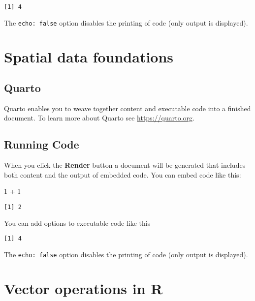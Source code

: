 \documentclass[
  letterpaper,
  DIV=11,
  numbers=noendperiod]{scrreprt}
\newenvironment{Shaded}{\begin{snugshade}}{\end{snugshade}}
\newcommand{\DecValTok}[1]{\textcolor[rgb]{0.68,0.00,0.00}{#1}}
\newcommand{\SpecialCharTok}[1]{\textcolor[rgb]{0.37,0.37,0.37}{#1}}
\begin{document}
\begin{verbatim}
[1] 4
\end{verbatim}

The \texttt{echo:\ false} option disables the printing of code (only
output is displayed).

\hypertarget{spatial-data-foundations}{%
\chapter{Spatial data foundations}\label{spatial-data-foundations}}

\hypertarget{quarto-2}{%
\section{Quarto}\label{quarto-2}}

Quarto enables you to weave together content and executable code into a
finished document. To learn more about Quarto see
\url{https://quarto.org}.

\hypertarget{running-code-2}{%
\section{Running Code}\label{running-code-2}}

When you click the \textbf{Render} button a document will be generated
that includes both content and the output of embedded code. You can
embed code like this:

\begin{Shaded}
\begin{Highlighting}[]
\DecValTok{1} \SpecialCharTok{+} \DecValTok{1}
\end{Highlighting}
\end{Shaded}

\begin{verbatim}
[1] 2
\end{verbatim}

You can add options to executable code like this

\begin{verbatim}
[1] 4
\end{verbatim}

The \texttt{echo:\ false} option disables the printing of code (only
output is displayed).

\hypertarget{vector-operations-in-r}{%
\chapter{Vector operations in R}\label{vector-operations-in-r}}
\end{document}

